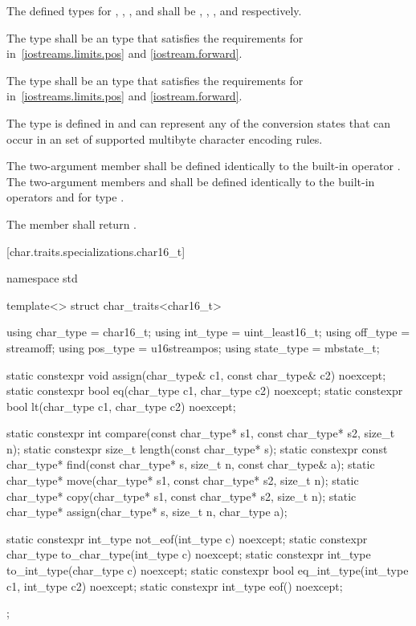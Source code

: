 \pnum
The defined types for
,
,
,
and
shall be
,
,
,
and
respectively.

\pnum
The type
shall be an  type that satisfies the requirements for
in~\ref{iostreams.limits.pos} and \ref{iostream.forward}.

\pnum
The type
shall be an  type that satisfies the requirements for
in~\ref{iostreams.limits.pos} and \ref{iostream.forward}.

\pnum
The type
is defined in
and can represent any of the conversion states that can occur in an
 set of supported multibyte
character encoding rules.

\pnum
The two-argument member  shall be defined identically to the
built-in operator \tcode{=}. The two-argument members 
and  shall be defined identically to the built-in operators
\tcode{==} and \tcode{<} for type 
.

\pnum
The member
shall return
.

[char.traits.specializations.char16_t]{}

%
\begin{codeblock}
namespace std {
  template<> struct char_traits<char16_t> {
    using char_type  = char16_t;
    using int_type   = uint_least16_t;
    using off_type   = streamoff;
    using pos_type   = u16streampos;
    using state_type = mbstate_t;

    static constexpr void assign(char_type& c1, const char_type& c2) noexcept;
    static constexpr bool eq(char_type c1, char_type c2) noexcept;
    static constexpr bool lt(char_type c1, char_type c2) noexcept;

    static constexpr int compare(const char_type* s1, const char_type* s2, size_t n);
    static constexpr size_t length(const char_type* s);
    static constexpr const char_type* find(const char_type* s, size_t n,
                                           const char_type& a);
    static char_type* move(char_type* s1, const char_type* s2, size_t n);
    static char_type* copy(char_type* s1, const char_type* s2, size_t n);
    static char_type* assign(char_type* s, size_t n, char_type a);

    static constexpr int_type not_eof(int_type c) noexcept;
    static constexpr char_type to_char_type(int_type c) noexcept;
    static constexpr int_type to_int_type(char_type c) noexcept;
    static constexpr bool eq_int_type(int_type c1, int_type c2) noexcept;
    static constexpr int_type eof() noexcept;
  };
}
\end{codeblock}

